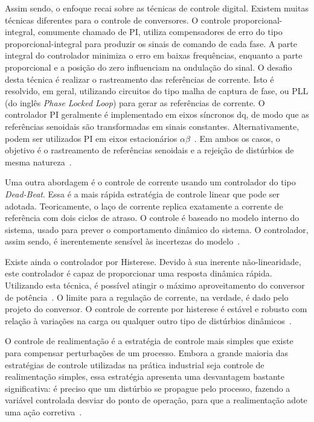 	Assim sendo, o enfoque recai sobre as técnicas de controle digital. Existem
	muitas técnicas diferentes para o controle de conversores. O controle
	proporcional-integral, comumente chamado de PI, utiliza compensadores de
	erro do tipo proporcional-integral para produzir os sinais de comando de
	cada fase. A parte integral do controlador minimiza o erro em baixas
	frequências, enquanto a parte proporcional e a posição do zero
	influenciam na ondulação do sinal. O desafio desta técnica é realizar o
	rastreamento das referências de corrente. Isto é resolvido, em geral,
	utilizando circuitos do tipo malha de captura de fase, ou PLL (do inglês
	\emph{Phase Locked Loop}) para gerar as referências de corrente. O controlador
	PI geralmente é implementado em eixos síncronos dq, de modo que as
	referências senoidais são transformadas em sinais constantes. Alternativamente,
	podem ser utilizados PI em eixos estacionários
	$\alpha \beta$~\cite{ref:KAZMIERKOWSKI}. Em ambos os casos, o objetivo é o
	rastreamento de referências senoidais e a rejeição de distúrbios de mesma
	natureza~\cite{ref:AREERAK}.

	Uma outra abordagem é o controle de corrente usando um controlador do tipo
	\emph{Dead-Beat}. Essa é a mais rápida estratégia de controle linear que pode
	ser adotada. Teoricamente, o laço de corrente replica exatamente a corrente
	de referência com dois ciclos de atraso. O controle é baseado no modelo interno
	do sistema, usado para prever o comportamento dinâmico do sistema. O
	controlador, assim sendo, é inerentemente sensível às incertezas do
	modelo~\cite{ref:MALESANI}.

	Existe ainda o controlador por Histerese. Devido à sua inerente não-linearidade,
	este controlador é capaz de proporcionar uma resposta dinâmica rápida.
	Utilizando esta técnica, é possível atingir o máximo aproveitamento do conversor
	de potência~\cite{ref:YAO}. O limite para a regulação de corrente, na verdade,
	é dado pelo projeto do conversor. O controle de corrente por histerese é estável
	e robusto com relação à variações na carga ou qualquer outro tipo de distúrbios
	dinâmicos~\cite{ref:TENTI}.

	O controle de realimentação é a estratégia de controle mais simples que existe
	para compensar perturbações de um processo. Embora a grande maioria das estratégias
	de controle utilizadas na prática industrial seja controle de realimentação simples,
	essa estratégia apresenta uma desvantagem bastante significativa: é preciso que
	um distúrbio se propague pelo processo, fazendo a variável controlada desviar
	do ponto de operação, para que a realimentação adote uma ação corretiva~\cite{ref:SMITH}.


